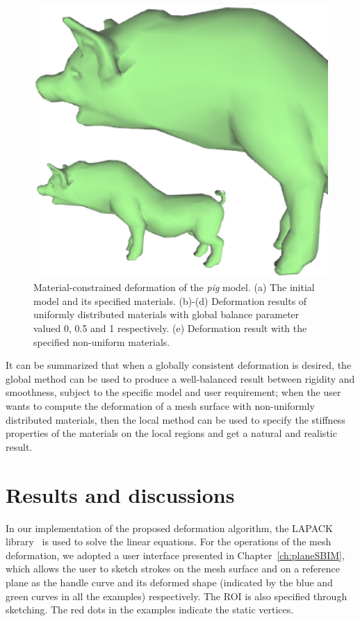 \begin{figure} [htbp]
{    \label{fig:deformpig:e}
    \begin{minipage}[b]{0.23\textwidth}
      \centering
      \includegraphics[scale=0.18]{figs/f5.10.PigMat5.eps}
    \end{minipage}}
  \caption{Material-constrained deformation of the \textit{pig} model. (a) The initial model and its specified materials. (b)-(d) Deformation results of uniformly distributed materials with global balance parameter valued 0, 0.5 and 1 respectively. (e) Deformation result with the specified non-uniform materials.}
  \label{fig:deformpig} %
\end{figure}


It can be summarized that when a globally  consistent deformation is
desired, the global method can be used to produce a well-balanced
result between rigidity and smoothness, subject to the specific
model and user requirement; when the user wants to compute the
deformation of a mesh surface with non-uniformly distributed
materials, then the local method can be used to specify the
stiffness properties of the materials on the local regions and get a
natural and realistic result.


\section{Results and discussions}
\label{ch5:sec:results}
In our implementation of the proposed  deformation algorithm, the
LAPACK library~\cite{ABBD92} is used to solve the linear equations.
For the operations of the mesh deformation, we adopted a user
interface presented in Chapter~\ref{ch:planeSBIM}, which allows the
user to sketch strokes on the mesh surface and on a reference plane
as the handle curve and its deformed shape (indicated by the blue
and green curves in all the examples) respectively. The ROI is also
specified through sketching. The red dots in the examples indicate
the static vertices.

